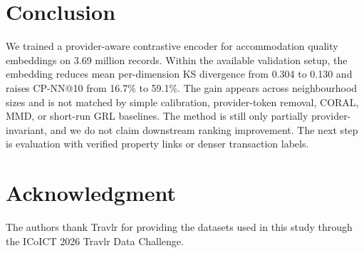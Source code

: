 \documentclass[conference,a4paper]{IEEEtran}
\begin{document}
\section{Conclusion}

We trained a provider-aware contrastive encoder for accommodation quality embeddings on 3.69 million records. Within the available validation setup, the embedding reduces mean per-dimension KS divergence from 0.304 to 0.130 and raises CP-NN@10 from 16.7\% to 59.1\%. The gain appears across neighbourhood sizes and is not matched by simple calibration, provider-token removal, CORAL, MMD, or short-run GRL baselines. The method is still only partially provider-invariant, and we do not claim downstream ranking improvement. The next step is evaluation with verified property links or denser transaction labels.

\section*{Acknowledgment}
The authors thank Travlr for providing the datasets used in this study through the ICoICT 2026 Travlr Data Challenge.



\end{document}
